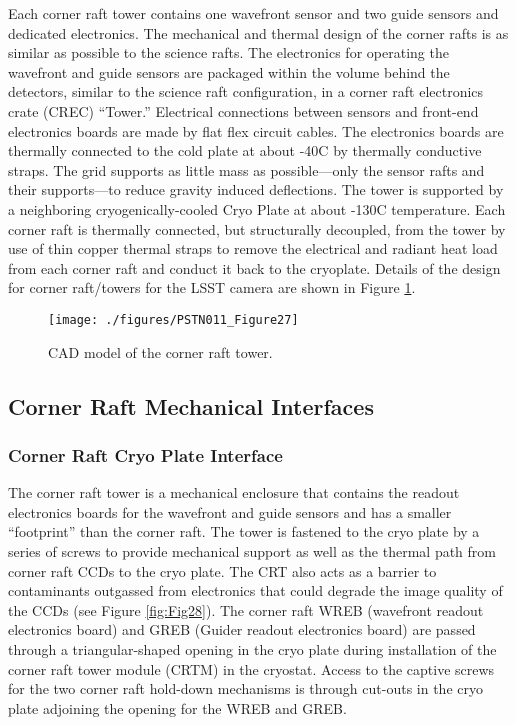 Each corner raft tower contains one wavefront sensor and two guide sensors and dedicated electronics.
The mechanical and thermal design of the corner rafts is as similar as possible to the science rafts.
The electronics for operating the wavefront and guide sensors are packaged within the volume behind
the detectors, similar to the science raft configuration, in a corner raft electronics crate (CREC) “Tower.”
Electrical connections between sensors and front-end electronics boards are made by flat flex circuit
cables. The electronics boards are thermally connected to the cold plate at about -40C by thermally
conductive straps. The grid supports as little mass as possible—only the sensor rafts and their
supports—to reduce gravity induced deflections. The tower is supported by a neighboring cryogenically-cooled
Cryo Plate at about -130C temperature. Each corner raft is thermally connected, but structurally
decoupled, from the tower by use of thin copper thermal straps to remove the electrical and radiant
heat load from each corner raft and conduct it back to the cryoplate. Details of the design for corner
raft/towers for the LSST camera are shown in Figure \ref{fig:Fig27}.

\begin{figure}[htbp]
\begin{center}
\texttt{[image: ./figures/PSTN011\_Figure27]}
\caption{CAD model of the corner raft tower.}
\label{fig:Fig27}
\end{center}
\end{figure}

\subsection{Corner Raft Mechanical Interfaces}

\subsubsection{Corner Raft Cryo Plate Interface}

The corner raft tower is a mechanical enclosure that contains the readout electronics boards for the
wavefront and guide sensors and has a smaller “footprint” than the corner raft. The tower is fastened
to the cryo plate by a series of screws to provide mechanical support as well as the thermal path from
corner raft CCDs to the cryo plate. The CRT also acts as a barrier to contaminants outgassed from
electronics that could degrade the image quality of the CCDs (see Figure \ref{fig:Fig28}).
The corner raft WREB (wavefront readout electronics board) and GREB (Guider readout electronics
board) are passed through a triangular-shaped opening in the cryo plate during installation of the corner
raft tower module (CRTM) in the cryostat. Access to the captive screws for the two corner raft hold-down
mechanisms is through cut-outs in the cryo plate adjoining the opening for the WREB and GREB.

